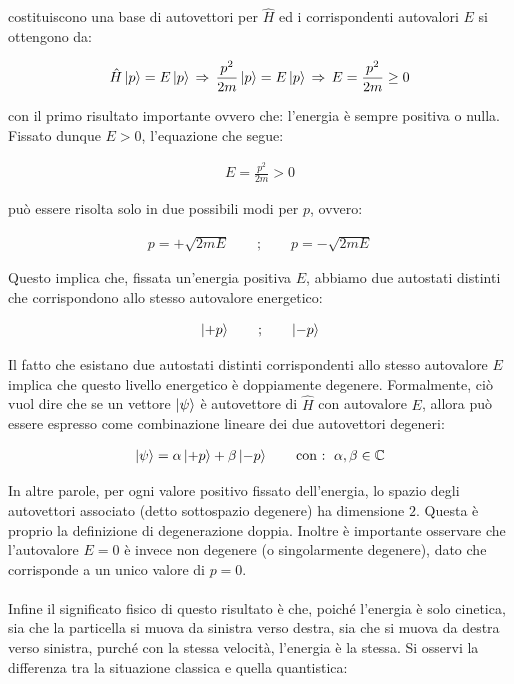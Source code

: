 	costituiscono una base di autovettori per $\hat{H}$ ed i corrispondenti autovalori $E$ si ottengono da:
	
\begin{align*}
	\hat{H} \ket{p} = E \ket{p} \, \Rightarrow \, \frac{p^2}{2m} \ket{p} = E \ket{p} \, \Rightarrow \, E = \frac{p^2}{2m} \geq 0
\end{align*}

	con il primo risultato importante ovvero che: l'energia è sempre positiva o nulla. Fissato dunque $E > 0$, l'equazione che segue:
	
\begin{align*}
	E = \frac{p^2}{2m} > 0
\end{align*}

	può essere risolta solo in due possibili modi per $p$, ovvero:

\begin{align*}
	p = + \sqrt{2mE} \qquad ; \qquad p = - \sqrt{2mE}
\end{align*}
	
	Questo implica che, fissata un'energia positiva $E$, abbiamo due autostati distinti che corrispondono allo stesso autovalore energetico:
	
\begin{align*}
	\ket{+p} \qquad ; \qquad \ket{-p} 
\end{align*}

	Il fatto che esistano due autostati distinti corrispondenti allo stesso autovalore $E$ implica che questo livello energetico è doppiamente degenere. Formalmente, ciò vuol dire che se un vettore $\ket{\psi}$ è autovettore di $\hat{H}$ con autovalore $E$, allora può essere espresso come combinazione lineare dei due autovettori degeneri:
	
\begin{align*}
	\ket{\psi} = \alpha \ket{+p} + \beta \ket{-p} \qquad \text{con : } \, \alpha, \beta \in \mathbb{C}
\end{align*}

	In altre parole, per ogni valore positivo fissato dell'energia, lo spazio degli autovettori associato (detto sottospazio degenere) ha dimensione $2$. Questa è proprio la definizione di degenerazione doppia. Inoltre è importante osservare che l'autovalore $E = 0$ è invece non degenere (o singolarmente degenere), dato che corrisponde a un unico valore di $p = 0$.
	\\
	\\
	Infine il significato fisico di questo risultato è che, poiché l’energia è solo cinetica, sia che la particella si muova da sinistra verso destra, sia che si muova da destra verso sinistra, purché con la stessa velocità, l’energia è la stessa. Si osservi la differenza tra la situazione classica e quella quantistica:
	

